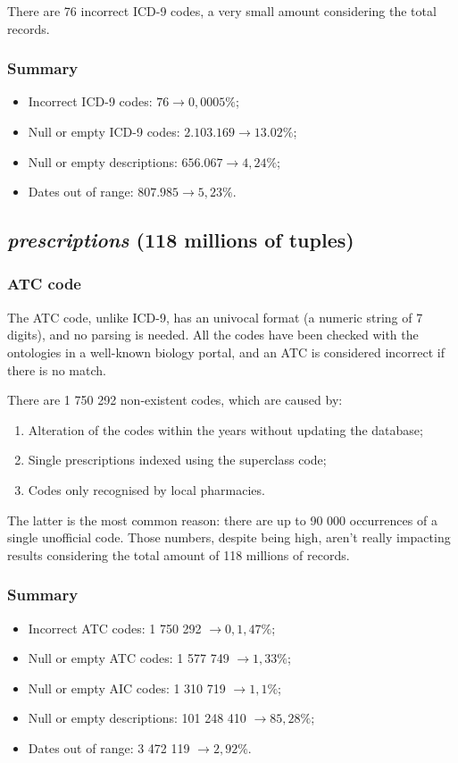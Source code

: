 There are 76 incorrect ICD-9 codes, a very small amount considering the total records.

\subsubsection{Summary}
\begin{itemize}
	\item Incorrect ICD-9 codes: $76 \rightarrow 0,0005\%$;
	\item Null or empty ICD-9 codes: $2.103.169 \rightarrow 13.02\%$;
	\item Null or empty descriptions: $656.067 \rightarrow 4,24\%$;
	\item Dates out of range: $807.985 \rightarrow 5,23\%$.
\end{itemize}

\subsection{\textit{prescriptions} (118 millions of tuples)}
\subsubsection{ATC code}
The ATC code, unlike ICD-9, has an univocal format (a numeric string of 7 digits), and no parsing is needed. All the codes have been checked with the ontologies in a well-known biology portal\cite{atc}, and an ATC is considered incorrect if there is no match.

There are 1 750 292 non-existent codes, which are caused by:
\begin{enumerate}
	\item Alteration of the codes within the years without updating the database;
	\item Single prescriptions indexed using the superclass code;
	\item Codes only recognised by local pharmacies.
\end{enumerate}

The latter is the most common reason: there are up to 90 000 occurrences of a single unofficial code. Those numbers, despite being high, aren't really impacting results considering the total amount of 118 millions of records.

\subsubsection{Summary}
\begin{itemize}
	\item Incorrect ATC codes: 1 750 292 $\rightarrow 0,1,47\%$;
	\item Null or empty ATC codes: 1 577 749 $\rightarrow 1,33\%$;
	\item Null or empty AIC codes: 1 310 719 $\rightarrow 1,1\%$;
	\item Null or empty descriptions: 101 248 410 $\rightarrow 85,28\%$;
	\item Dates out of range: 3 472 119 $\rightarrow 2,92\%$.
\end{itemize}

